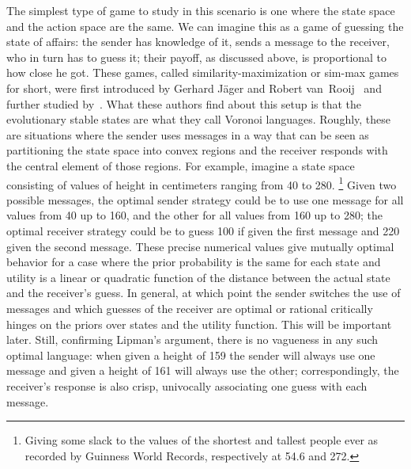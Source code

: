 \documentclass[a4paper]{article}
\begin{document}
The simplest type of game to study in this scenario is one where the state space and the action space are the same. 
We can imagine this as a game of guessing the state of affairs: the sender has knowledge of it, sends a message to the receiver, who in turn has to guess it; their payoff, as discussed above, is proportional to how close he got. 
These games, called similarity-maximization or sim-max games for short, were first introduced by Gerhard J{\"a}ger and Robert van~Rooij~\parencite{jager_language_2007,Jager2007} and further studied by~\textcite{jager_voronoi_2011}.
What these authors find about this setup is that the evolutionary stable states are what they call Voronoi languages.
Roughly, these are situations where the sender uses messages in a way that can be seen as partitioning the state space into convex regions and the receiver responds with the central element of those regions.
For example, imagine a state space consisting of values of height in centimeters ranging from 40 to 280.%
\footnote{Giving some slack to the values of the shortest and tallest people ever as recorded by Guinness World Records, respectively at 54.6 and 272.}
Given two possible messages, the optimal sender strategy could be to use one message for all values from 40 up to 160, and the other for all values from 160 up to 280; the optimal receiver strategy could be to guess 100 if given the first message and 220 given the second message.
These precise numerical values give mutually optimal behavior for a case where the prior probability is the same for each state and utility is a linear or quadratic function of the distance between the actual state and the receiver's guess.
In general, at which point the sender switches the use of messages and which guesses of the receiver are optimal or rational critically hinges on the priors over states and the utility function.
This will be important later.
Still, confirming Lipman's argument, there is no vagueness in any such optimal language: when given a height of 159 the sender will always use one message and given a height of 161 will always use the other; correspondingly, the receiver's response is also crisp, univocally associating one guess with each message.
\end{document}
